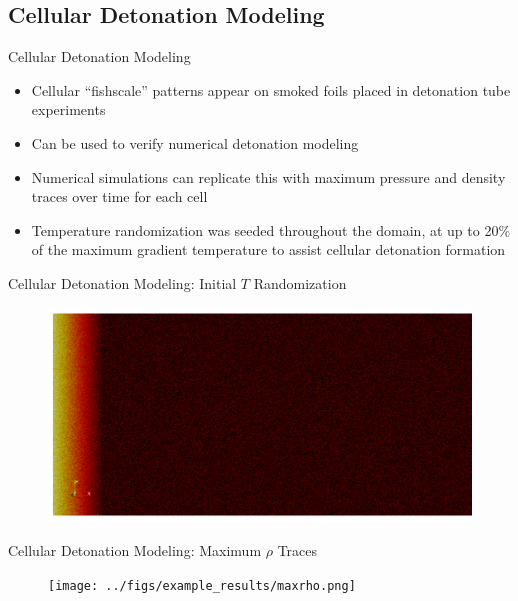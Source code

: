 \subsection{Cellular Detonation Modeling}

\begin{frame}{Cellular Detonation Modeling}
\begin{itemize}
\item Cellular ``fishscale'' patterns appear on smoked foils placed in detonation tube experiments
\item Can be used to verify numerical detonation modeling 
\item Numerical simulations can replicate this with maximum pressure and density traces over time for each cell
\item Temperature randomization was seeded throughout the domain, at up to 20\% of the maximum gradient temperature to assist cellular detonation formation 
\end{itemize}
\end{frame}

\begin{frame}{Cellular Detonation Modeling: Initial $T$ Randomization}
\begin{figure}[]
\centering
\includegraphics[width=\textwidth]{../figs/ignition/randgrad.png}
\end{figure}
\end{frame}

\begin{frame}{Cellular Detonation Modeling: Maximum $\rho$ Traces}
\begin{figure}[]
\centering
\texttt{[image: ../figs/example\_results/maxrho.png]}
\end{figure}
\end{frame}
